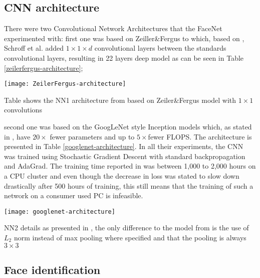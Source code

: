 \subsection{CNN architecture}
There were two Convolutional Network Architectures that the FaceNet experimented with: first one was based on Zeiller\&Fergus \cite{ZeilerF13} to which, based on \cite{LinCY13}, Schroff et al. added $1 \times 1 \times d$ convolutional layers between the standards convolutional layers, resulting in 22 layers deep model as can be seen in Table \ref{zeilerfergus-architecture};
\begin{table}[h]
	\begin{center}
		\texttt{[image: ZeilerFergus-architecture]}
	\end{center}
	\caption[Zeiler\&Fergus architecture used in FaceNet]{Table shows the NN1 architecture from \cite{SchroffKP15} based on Zeiler\&Fergus model with $1 \times 1$ convolutions}
	\label{zeilerfergus-architecture}
\end{table}
 second one was based on the GoogLeNet style Inception models \cite{DSzegedyLJSRAEVR14} which, as stated in \cite{SchroffKP15}, have $20\times$ fewer parameters and up to $5\times$fewer FLOPS. The architecture is presented in Table \ref{googlenet-architecture}. In all their experiments, the CNN was trained using Stochastic Gradient Descent with standard backpropagation and AdaGrad. The training time reported in \cite{SchroffKP15} was between 1,000 to 2,000 hours on a CPU cluster and even though the decrease in loss was stated to slow down drastically after 500 hours of training, this still means that the training of such a network on a consumer used PC is infeasible. 
 \begin{table}[h]
 	\begin{center}
 		\texttt{[image: googlenet-architecture]}
 	\end{center}
 	\caption[NN2 Inception CNN architecture]{NN2 details as presented in \cite{SchroffKP15}, the only difference to the model from \cite{DSzegedyLJSRAEVR14} is the use of $L_2$ norm instead of max pooling where specified and that the pooling is always $3\times3$}
 	\label{googlenet-architecture}
 \end{table}
\subsection{Face identification} \label{face_recognition}

